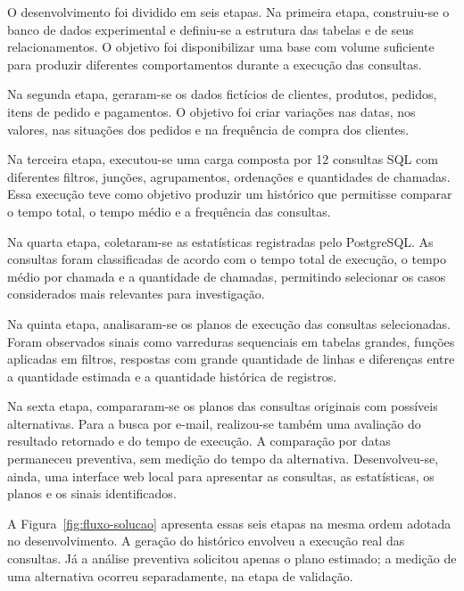 \documentclass{UNESC}
\begin{document}
O desenvolvimento foi dividido em seis etapas. Na primeira etapa, construiu-se o banco de dados experimental e definiu-se a estrutura das tabelas e de seus relacionamentos. O objetivo foi disponibilizar uma base com volume suficiente para produzir diferentes comportamentos durante a execução das consultas.

Na segunda etapa, geraram-se os dados fictícios de clientes, produtos, pedidos, itens de pedido e pagamentos. O objetivo foi criar variações nas datas, nos valores, nas situações dos pedidos e na frequência de compra dos clientes.

Na terceira etapa, executou-se uma carga composta por 12 consultas SQL com diferentes filtros, junções, agrupamentos, ordenações e quantidades de chamadas. Essa execução teve como objetivo produzir um histórico que permitisse comparar o tempo total, o tempo médio e a frequência das consultas.

Na quarta etapa, coletaram-se as estatísticas registradas pelo PostgreSQL. As consultas foram classificadas de acordo com o tempo total de execução, o tempo médio por chamada e a quantidade de chamadas, permitindo selecionar os casos considerados mais relevantes para investigação.

Na quinta etapa, analisaram-se os planos de execução das consultas selecionadas. Foram observados sinais como varreduras sequenciais em tabelas grandes, funções aplicadas em filtros, respostas com grande quantidade de linhas e diferenças entre a quantidade estimada e a quantidade histórica de registros.

Na sexta etapa, compararam-se os planos das consultas originais com possíveis alternativas. Para a busca por e-mail, realizou-se também uma avaliação do resultado retornado e do tempo de execução. A comparação por datas permaneceu preventiva, sem medição do tempo da alternativa. Desenvolveu-se, ainda, uma interface web local para apresentar as consultas, as estatísticas, os planos e os sinais identificados.

A Figura~\ref{fig:fluxo-solucao} apresenta essas seis etapas na mesma ordem adotada no desenvolvimento. A geração do histórico envolveu a execução real das consultas. Já a análise preventiva solicitou apenas o plano estimado; a medição de uma alternativa ocorreu separadamente, na etapa de validação.
\end{document}
